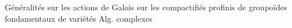 Généralités sur les actions  de Galois sur les compactifiés profinis de groupoïdes fondamentaux de variétés Alg. complexes

